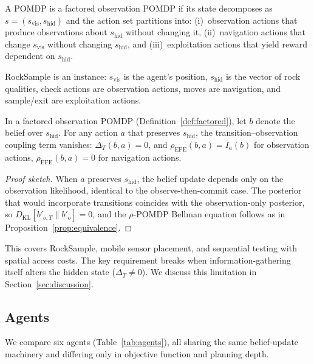 \documentclass[runningheads]{llncs}
\begin{document}
\begin{definition}
\label{def:factored}
A POMDP is a factored observation POMDP if its state decomposes as $s = (s_{\mathrm{vis}}, s_{\mathrm{hid}})$ and the action set partitions into: (i)~observation actions that produce observations about $s_{\mathrm{hid}}$ without changing it, (ii)~navigation actions that change $s_{\mathrm{vis}}$ without changing $s_{\mathrm{hid}}$, and (iii)~exploitation actions that yield reward dependent on $s_{\mathrm{hid}}$.
\end{definition}

RockSample \citep{smith2004} is an instance: $s_{\mathrm{vis}}$ is the agent's position, $s_{\mathrm{hid}}$ is the vector of rock qualities, check actions are observation actions, moves are navigation, and sample/exit are exploitation actions.

\begin{proposition}
\label{prop:factored}
In a factored observation POMDP (Definition~\ref{def:factored}), let $b$ denote the belief over $s_{\mathrm{hid}}$. For any action $a$ that preserves $s_{\mathrm{hid}}$, the transition--observation coupling term vanishes: $\Delta_T(b, a) = 0$, and $\rho_{\mathrm{EFE}}(b, a) = I_a(b)$ for observation actions, $\rho_{\mathrm{EFE}}(b, a) = 0$ for navigation actions.
\end{proposition}
\begin{proof}[Proof sketch]
When $a$ preserves $s_{\mathrm{hid}}$, the belief update depends only on the observation likelihood, identical to the observe-then-commit case. The posterior that would incorporate transitions coincides with the observation-only posterior, so $D_{\mathrm{KL}}[b'_{o,T} \| b'_o] = 0$, and the $\rho$-POMDP Bellman equation follows as in Proposition~\ref{prop:equivalence}.
\end{proof}

This covers RockSample, mobile sensor placement, and sequential testing with spatial access costs. The key requirement breaks when information-gathering itself alters the hidden state ($\Delta_T \neq 0$). We discuss this limitation in Section~\ref{sec:discussion}.

\subsection{Agents}

We compare six agents (Table~\ref{tab:agents}), all sharing the same belief-update machinery and differing only in objective function and planning depth.
\end{document}
